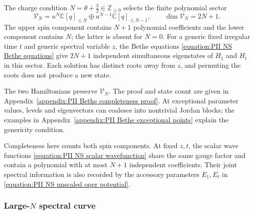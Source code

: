 \documentclass[a4paper,11pt]{article}
\numberwithin{equation}{section}
\begin{document}
The charge condition
$N=\theta+\frac{3}{2}\in\mathbb{Z}_{\geq 0}$ selects the finite
polynomial sector
\begin{equation}
	\label{equation:PII NS polynomial sector}
	\mathcal{V}_{N}
	=u^{N}\mathbb{C}[q]_{\leq N}
	\oplus u^{N-1}\mathbb{C}[q]_{\leq N-1},
	\qquad \dim\mathcal{V}_{N}=2N+1.
\end{equation}
The upper spin component contains $N+1$ polynomial coefficients and
the lower component contains $N$; the latter is absent for $N=0$.
For a generic fixed irregular time $t$ and generic spectral variable
$z$, the Bethe equations \eqref{equation:PII NS Bethe equations}
give $2N+1$ independent simultaneous eigenstates of $H_{1}$ and
$H_{t}$ in this sector.  Each solution has distinct roots away from
$z$, and permuting the roots does not produce a new state.

The two Hamiltonians preserve $\mathcal{V}_{N}$.  The proof and
state count are given in
Appendix~\ref{appendix:PII Bethe completeness proof}.
At exceptional parameter values, levels and eigenvectors can
coalesce into nontrivial Jordan blocks; the examples in
Appendix~\ref{appendix:PII Bethe exceptional points} explain the
genericity condition.

Completeness here counts both spin components.  At fixed $z,t$,
the scalar wave functions \eqref{equation:PII NS scalar wavefunction}
share the same gauge factor and contain a polynomial with at most
$N+1$ independent coefficients.  Their joint spectral information
is also recorded by the accessory parameters $E_{1},E_{t}$ in
\eqref{equation:PII NS unscaled oper potential}.

\subsubsection{Large-\texorpdfstring{$N$}{N} spectral curve}
\label{subsection:PII NS subsequent classical limit}
\end{document}
